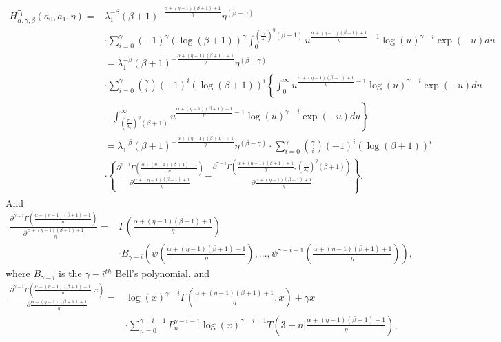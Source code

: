 \documentclass{article}
\begin{document}
\begin{align*}
H_{\alpha,\gamma,\beta}^{\tau_1}(a_0,a_1,\eta)=&\lambda_1^{-\beta}(\beta+1)^{-\frac{\alpha+(\eta-1)(\beta+1)+1}{\eta}}\eta^{(\beta-\gamma)}
\\
&\cdot \sum_{i=0}^{\gamma}(-1)^{\gamma}\left(\log\left(\beta+1\right)\right)^{\gamma}\int_{0}^{\left(\frac{\tau_1}{\lambda_1}\right)^{\eta}(\beta+1)}u^{\frac{\alpha+(\eta-1)(\beta+1)+1}{\eta}-1}\log(u)^{\gamma-i}\exp(-u)du
\\
&=\lambda_1^{-\beta}(\beta+1)^{-\frac{\alpha+(\eta-1)(\beta+1)+1}{\eta}}\eta^{(\beta-\gamma)}
\\
&\cdot\sum_{i=0}^{\gamma}\binom{\gamma}{i}(-1)^{i}\left(\log\left(\beta+1\right)\right)^{i} \left\{\int_{0}^{\infty}u^{\frac{\alpha+(\eta-1)(\beta+1)+1}{\eta}-1}\log(u)^{\gamma-i}\exp(-u)du\right.
\\
&-\left.\int_{\left(\frac{\tau_1}{\lambda_1}\right)^{\eta}(\beta+1)}^{\infty}u^{\frac{\alpha+(\eta-1)(\beta+1)+1}{\eta}-1}\log(u)^{\gamma-i}\exp(-u)du\right\}
\\
&=\lambda_1^{-\beta}(\beta+1)^{-\frac{\alpha+(\eta-1)(\beta+1)+1}{\eta}}\eta^{(\beta-\gamma)} \cdot\sum_{i=0}^{\gamma}\binom{\gamma}{i}(-1)^{i}\left(\log\left(\beta+1\right)\right)^{i}
\\
 &\cdot \left\{\frac{\partial^{\gamma-i}\Gamma\left(\frac{\alpha+(\eta-1)(\beta+1)+1}{\eta}\right)}{\partial  \frac{\alpha+(\eta-1)(\beta+1)+1}{\eta}} \right.\left .-  \frac{\partial^{\gamma-i}\Gamma\left(\frac{\alpha+(\eta-1)(\beta+1)+1}{\eta},\left(\frac{\tau_1}{\lambda_1}\right)^{\eta}(\beta+1) \right)}{\partial  \frac{\alpha+(\eta-1)(\beta+1)+1}{\eta}}   \right\}.
\end{align*}
And 
\begin{align*}
\frac{\partial^{\gamma-i}\Gamma\left(\frac{\alpha+(\eta-1)(\beta+1)+1}{\eta}\right)}{\partial  \frac{\alpha+(\eta-1)(\beta+1)+1}{\eta}}=&\Gamma\left(\frac{\alpha+(\eta-1)(\beta+1)+1}{\eta}\right)
\\
&\cdot B_{\gamma-i}\left(\psi \left(\frac{\alpha+(\eta-1)(\beta+1)+1}{\eta}\right), ..., \psi^{\gamma-i-1}\left(\frac{\alpha+(\eta-1)(\beta+1)+1}{\eta}\right)\right),
\end{align*}
where $B_{\gamma-i}$ is the $\gamma-i^{th}$ Bell's polynomial,
and
\begin{align*}
 \frac{\partial^{\gamma-i}\Gamma\left(\frac{\alpha+(\eta-1)(\beta+1)+1}{\eta},x \right)}{\partial  \frac{\alpha+(\eta-1)(\beta+1)+1}{\eta}} =&\log(x)^{\gamma-i}\Gamma\left(\frac{\alpha+(\eta-1)(\beta+1)+1}{\eta},x \right)+ \gamma x
 \\
 &\cdot\sum_{n=0}^{\gamma-i-1}P_n^{\gamma-i-1}\log(x)^{\gamma-i-1}T\left(3+n \big|  \frac{\alpha+(\eta-1)(\beta+1)+1}{\eta}\right),
\end{align*}
\end{document}
